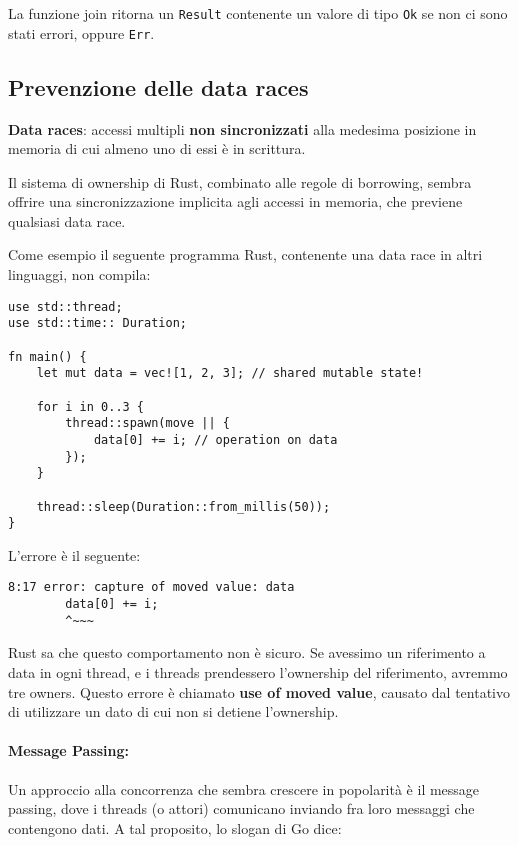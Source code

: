 La funzione join ritorna un \texttt{Result} contenente un valore di tipo
\texttt{Ok} se non ci sono stati errori, oppure \texttt{Err}.

\subsection{Prevenzione delle data races}

\textbf{Data races}: accessi multipli \textbf{non sincronizzati} alla
medesima posizione in memoria di cui almeno uno di essi è in scrittura.

Il sistema di ownership di Rust, combinato alle regole di borrowing,
sembra offrire una sincronizzazione implicita agli accessi in memoria,
che previene qualsiasi data race.

Come esempio il seguente programma Rust, contenente una data race
in altri linguaggi, non compila:

\begin{verbatim}
use std::thread;
use std::time:: Duration;

fn main() {
    let mut data = vec![1, 2, 3]; // shared mutable state!

    for i in 0..3 {
        thread::spawn(move || {
            data[0] += i; // operation on data
        });
    }

    thread::sleep(Duration::from_millis(50));
}
\end{verbatim}

L’errore è il seguente:

\begin{verbatim}
8:17 error: capture of moved value: data
        data[0] += i;
        ^~~~
\end{verbatim}

Rust sa che questo comportamento non è sicuro. Se avessimo un riferimento a data
in ogni thread, e i threads prendessero l’ownership del riferimento, avremmo
tre owners. Questo errore è chiamato \textbf{use of moved value}, causato dal
tentativo di utilizzare un dato di cui non si detiene l'ownership.

\paragraph{Message Passing:}

Un approccio alla concorrenza che sembra crescere in popolarità è il
message passing, dove i threads (o attori) comunicano inviando fra loro
messaggi che contengono dati.
A tal proposito, lo slogan di Go dice: \\

